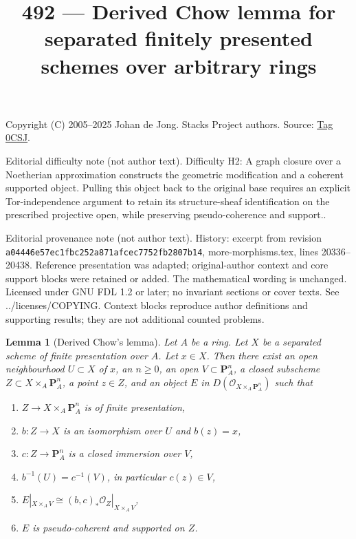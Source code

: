 \documentclass{amsart}
\theoremstyle{plain}
\newtheorem{lemma}[subsection]{Lemma}
\theoremstyle{definition}
\theoremstyle{remark}
\numberwithin{equation}{subsection}
\begin{document}
\title[Stacks Project, Tag 0CSJ]{492 --- Derived Chow lemma for separated finitely presented schemes over arbitrary rings}
\maketitle
\noindent Copyright (C) 2005--2025 Johan de Jong. Stacks Project authors. Source: \href{https://stacks.math.columbia.edu/tag/0CSJ}{Tag 0CSJ}.

\noindent Editorial difficulty note (not author text). Difficulty H2: A graph closure over a Noetherian approximation constructs the geometric modification and a coherent supported object. Pulling this object back to the original base requires an explicit Tor-independence argument to retain its structure-sheaf identification on the prescribed projective open, while preserving pseudo-coherence and support..

\noindent Editorial provenance note (not author text). History: excerpt from revision \texttt{a0444\allowbreak 6e57e\allowbreak c1fbc\allowbreak 252a8\allowbreak 71afc\allowbreak ec775\allowbreak 2fb28\allowbreak 07b14}, more-morphisms.tex, lines 20336--20438. Reference presentation was adapted; original-author context and core support blocks were retained or added. The mathematical wording is unchanged. Licensed under GNU FDL 1.2 or later; no invariant sections or cover texts. See ../licenses/COPYING. Context blocks reproduce author definitions and supporting results; they are not additional counted problems.

\begin{lemma}[Derived Chow's lemma]
\label{lemma-derived-chow}
Let $A$ be a ring. Let $X$ be a separated scheme of finite presentation
over $A$. Let $x \in X$. Then there exist
an open neighbourhood $U \subset X$ of $x$,
an $n \geq 0$,
an open $V \subset \mathbf{P}^n_A$,
a closed subscheme $Z \subset X \times_A \mathbf{P}^n_A$,
a point $z \in Z$, and
an object $E$ in $D(\mathcal{O}_{X \times_A \mathbf{P}^n_A})$ such that
\begin{enumerate}
\item $Z \to X \times_A \mathbf{P}^n_A$ is of finite presentation,
\item $b : Z \to X$ is an isomorphism over $U$ and $b(z) = x$,
\item $c : Z \to \mathbf{P}^n_A$ is a closed immersion over $V$,
\item $b^{-1}(U) = c^{-1}(V)$, in particular $c(z) \in V$,
\item $E|_{X \times_A V} \cong
(b, c)_*\mathcal{O}_Z|_{X \times_A V}$,
\item $E$ is pseudo-coherent and supported on $Z$.
\end{enumerate}
\end{lemma}
\end{document}
